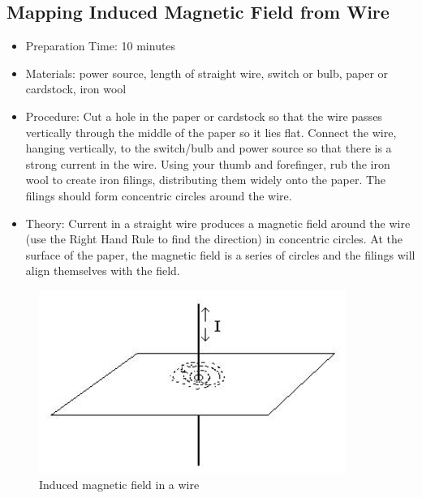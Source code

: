 \subsection{Mapping Induced Magnetic Field from Wire}
\begin{itemize}
\item{Preparation Time: 10 minutes}
\item{Materials: power source, length of straight wire, switch or bulb, paper or cardstock, iron wool}
\item{Procedure: Cut a hole in the paper or cardstock so that the wire passes vertically through the middle of the paper so it lies flat. Connect the wire, hanging vertically, to the switch/bulb and power source so that there is a strong current in the wire. Using your thumb and forefinger, rub the iron wool to create iron filings, distributing them widely onto the paper. The filings should form concentric circles around the wire.}
\item{Theory: Current in a straight wire produces a magnetic field around the wire (use the Right Hand Rule to find the direction) in concentric circles. At the surface of the paper, the magnetic field is a series of circles and the filings will align themselves with the field.}
\end{itemize}

\begin{figure}[h!]
\begin{center}
\includegraphics[width=10cm]{./img/induced-mag-field-wire.png}
\caption{Induced magnetic field in a wire}
\label{fig:induced-mag-field-wire}
\end{center}
\end{figure}

	
